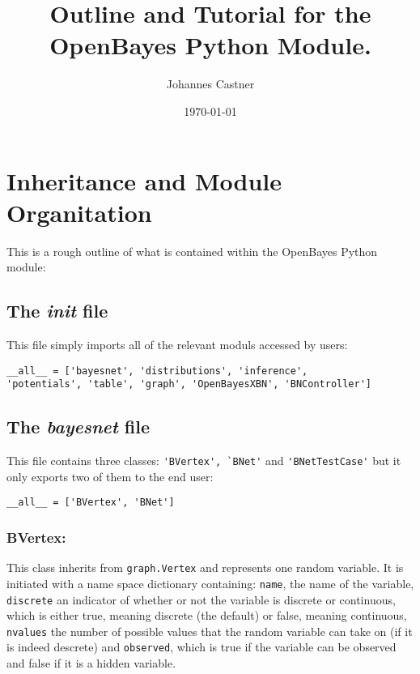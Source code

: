 \documentclass[11pt]{article}
\title{Outline and Tutorial for the OpenBayes Python Module.}
\author{Johannes Castner}
\date{\today}
\begin{document}
\maketitle

\setcounter{tocdepth}{3}
\tableofcontents
\vspace*{1cm}


\newpage

\section{Inheritance and Module Organitation}
\label{sec-1}


This is a rough outline of what is contained within the OpenBayes Python module:
\subsection{The \textit{init} file}
\label{sec-1-1}


This file simply imports all of the relevant moduls accessed by users:

\begin{verbatim}
__all__ = ['bayesnet', 'distributions', 'inference',
'potentials', 'table', 'graph', 'OpenBayesXBN', 'BNController']
\end{verbatim}
\subsection{The \textit{bayesnet} file}
\label{sec-1-2}


This file contains three classes: \verb|'BVertex', `BNet'| and \verb|'BNetTestCase'| but it only exports two of them to the end user:

\begin{verbatim}
__all__ = ['BVertex', 'BNet']
\end{verbatim}
\subsubsection{BVertex:}
\label{sec-1-2-1}

This class inherits from \verb|graph.Vertex| and represents one random variable. It is initiated with a name space dictionary containing: \verb|name|, the name of the variable, \verb|discrete| an indicator of whether or not the variable is discrete or continuous, which is either true, meaning discrete (the default) or false, meaning continuous, \verb|nvalues| the number of possible values that the random variable can take on (if it is indeed descrete) and \verb|observed|, which is true if the variable can be observed and false if it is a hidden variable.
\end{document}
